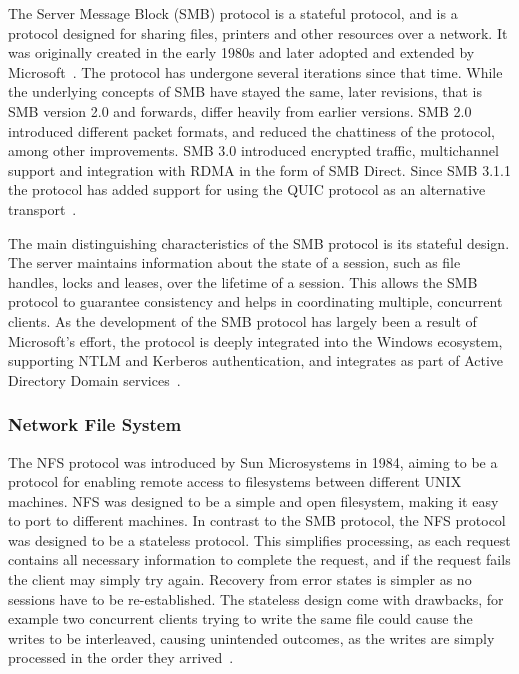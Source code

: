 \documentclass[english, 12pt, a4paper, elec, utf8, a-2b, online]{aaltothesis}
\begin{document}
The Server Message Block (SMB) protocol is a stateful protocol, and is a protocol designed for
sharing files, printers and other resources over a network. It was originally created
in the early 1980s and later adopted and extended by Microsoft~\cite{samba_myths}.
The protocol has undergone several iterations since that time. While the underlying
concepts of SMB have stayed the same, later revisions, that is SMB version 2.0 and forwards,
differ heavily from earlier versions. SMB 2.0 introduced different packet formats, and reduced
the chattiness of the protocol, among other improvements. SMB 3.0 introduced encrypted traffic,
multichannel support and integration with RDMA in the form of SMB Direct. Since SMB 3.1.1 the
protocol has added support for using the QUIC protocol as an alternative transport~\cite{smb2}.

The main distinguishing characteristics of the SMB protocol is its stateful design.
The server maintains information about the state of a session, such as file handles,
locks and leases, over the lifetime of a session. This allows the SMB protocol to
guarantee consistency and helps in coordinating multiple, concurrent clients. As 
the development of the SMB protocol has largely been a result of Microsoft's effort,
the protocol is deeply integrated into the Windows ecosystem,
supporting NTLM and Kerberos authentication, and integrates as part of Active Directory Domain
services~\cite{smb2}.

\subsubsection{Network File System}

The NFS protocol was introduced by Sun Microsystems in 1984, aiming to be a protocol
for enabling remote access to filesystems between different UNIX machines. NFS was
designed to be a simple and open filesystem, making it easy to port to different
machines. In contrast to the SMB protocol, the NFS protocol was designed to be a 
stateless protocol. This simplifies processing, as each request contains all necessary
information to complete the request, and if the request fails the client may
simply try again. Recovery from error states is simpler as no sessions have to be
re-established. The stateless  design come with drawbacks,
for example two concurrent clients trying to write the same file could cause the
writes to be interleaved, causing unintended outcomes, as the writes are simply
processed in the order they arrived~\cite{nfs_design}.
\end{document}
